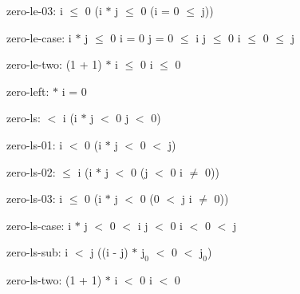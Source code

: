 \documentclass[a4paper]{article}
\begin{document}
\item	zero-le-03:  \Fol i $\le$ 0 \Imp (i $*$ j $\le$ 0 \Equiv \Not \Not (i = 0  $\le$ j))

\item	zero-le-case:  \Fol i $*$ j $\le$ 0 \Equiv i = 0 \Or j = 0  $\le$ i \And j $\le$ 0 \Or i $\le$ 0  $\le$ j

\item	zero-le-two:  \Fol (1 + 1) $*$ i $\le$ 0 \Equiv i $\le$ 0

\item	zero-left:   $*$ i = 0

\item	zero-ls:   $<$ i \Imp (i $*$ j $<$ 0 \Equiv j $<$ 0)

\item	zero-ls-01:  \Fol i $<$ 0 \Imp (i $*$ j $<$ 0  $<$ j)

\item	zero-ls-02:   $\le$ i \Imp (i $*$ j $<$ 0 \Equiv \Not \Not (j $<$ 0 \And i $\neq$ 0))

\item	zero-ls-03:  \Fol i $\le$ 0 \Imp (i $*$ j $<$ 0 \Equiv \Not \Not (0 $<$ j \And i $\neq$ 0))

\item	zero-ls-case:  \Fol i $*$ j $<$ 0  $<$ i \And j $<$ 0 \Or i $<$ 0  $<$ j

\item	zero-ls-sub:  \Fol i $<$ j \Imp ((i - j) $*$ $\mbox{j}_{0}$ $<$ 0  $<$ $\mbox{j}_{0}$)

\item	zero-ls-two:  \Fol (1 + 1) $*$ i $<$ 0 \Equiv i $<$ 0
\end{document}
